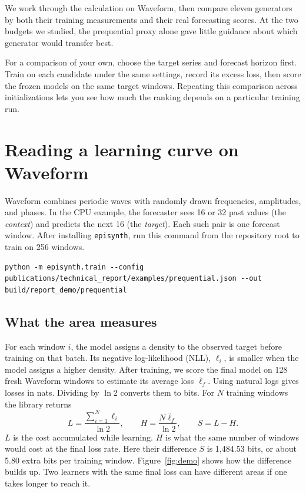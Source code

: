 \documentclass[11pt,a4paper]{article}
\begin{document}
We work through the calculation on Waveform, then compare eleven generators
by both their training measurements and their real forecasting scores. At
the two budgets we studied, the prequential proxy alone gave little
guidance about which generator would transfer best.

For a comparison of your own, choose the target series and forecast horizon
first. Train on each candidate under the same settings, record its excess
loss, then score the frozen models on the same target windows. Repeating
this comparison across initializations lets you see how much the ranking
depends on a particular training run.

\begingroup
\small
\setlength{\parskip}{0pt}
\tableofcontents
\endgroup

\clearpage
\section{Reading a learning curve on Waveform}\label{sec:waveform-example}
Waveform combines periodic waves with randomly drawn frequencies, amplitudes,
and phases. In the CPU example, the forecaster sees 16 or 32 past values
(the \emph{context}) and predicts the next 16 (the \emph{target}). Each such
pair is one forecast window. After installing \texttt{episynth}, run this
command from the repository root to train on 256 windows.
\begin{lstlisting}
python -m episynth.train --config publications/technical_report/examples/prequential.json --out build/report_demo/prequential
\end{lstlisting}

\subsection{What the area measures}\label{sec:prequential}
For each window $i$, the model assigns a density to the observed target
before training on that batch. Its negative log-likelihood (NLL), $\ell_i$,
is smaller when the model assigns a higher density. After training, we score
the final model on 128 fresh Waveform windows to estimate its average loss
$\bar\ell_f$. Using natural logs gives losses in nats. Dividing by $\ln 2$
converts them to bits. For $N$ training windows the library returns
\begin{equation}
 L=\frac{\sum_{i=1}^{N}\ell_i}{\ln 2},\qquad
 H=\frac{N\bar\ell_f}{\ln 2},\qquad S=L-H .
 \label{eq:area}
\end{equation}
$L$ is the cost accumulated while learning. $H$ is what the same number
of windows would cost at the final loss rate. Here their difference $S$
is 1,484.53 bits, or about 5.80 extra bits per training window.
Figure~\ref{fig:demo} shows how the difference builds up. Two learners
with the same final loss can have different areas if one takes longer to
reach it.
\end{document}
